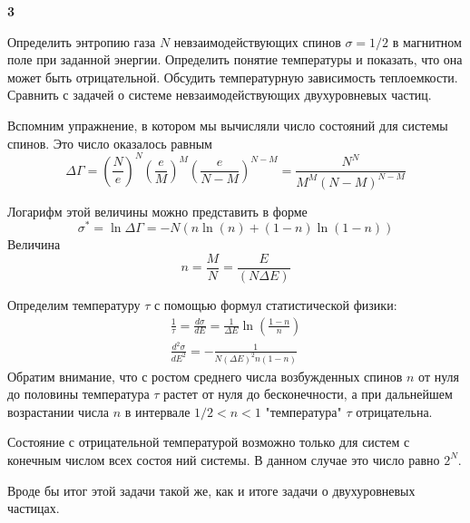 \documentclass[a4paper,12pt]{article} %
\begin{document}
\begin{ttask} \textbf{3}

Определить энтропию газа $ N $ невзаимодействующих спинов  $\sigma= 1/2$ в магнитном поле при заданной энергии. 
Определить понятие температуры и показать, что она может быть отрицательной. 
Обсудить температурную зависимость теплоемкости. 
Сравнить с задачей о системе невзаимодействующих двухуровневых частиц.


Вспомним упражнение, в котором мы вычисляли число состояний для системы спинов. Это число оказалось равным
$$
\Delta \Gamma=\left(\frac{N}{e}\right)^{N}\left(\frac{e}{M}\right)^{M}\left(\frac{e}{N-M}\right)^{N-M}=\frac{N^{N}}{M^{M}(N-M)^{N-M}}
$$

Логарифм этой величины можно представить в форме
$$
\sigma^{*}=\ln \Delta \Gamma=-N(n \ln (n)+(1-n) \ln (1-n))
$$
Величина
$$
n=\frac{M}{N}=\frac{E}{(N \Delta E)}
$$

Определим температуру $\tau$  с помощью формул статистической физики:
$$
\begin{array}{l}
\frac{1}{\tau}=\frac{d \sigma}{d E}=\frac{1}{\Delta E} \ln \left(\frac{1-n}{n}\right) \\
\frac{d^{2} \sigma}{d E^{2}}=-\frac{1}{N(\Delta E)^{2} n(1-n)}
\end{array}
$$
Обратим внимание, что с ростом среднего числа возбужденных спинов $n$ от нуля до половины температура $\tau$ растет от нуля до бесконечности, а при дальнейшем возрастании числа $n$ в интервале $1 / 2<n<1$ "температура" $\tau$ отрицательна. 

Состояние с отрицательной температурой возможно только для систем с конечным числом всех состоя ний системы. 
В данном случае это число равно $2^{N}$.


Вроде бы итог этой задачи такой же, как и итоге задачи о двухуровневых частицах.


\end{ttask}
\end{document}
